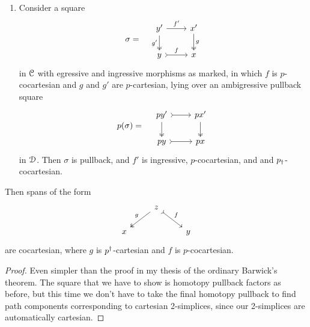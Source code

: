 \documentclass[main.tex]{subfiles}
\begin{document}
\begin{theorem}
\begin{enumerate}
    \item Consider a square
      \begin{equation*}
          \sigma = \quad
          \begin{tikzcd}
            y'
            \arrow[r, "f'"]
            \arrow[d, two heads, swap, "g'"]
            & x'
            \arrow[d, two heads, "g"]
            \\
            y
            \arrow[r, rightarrowtail, "f"]
            & x
          \end{tikzcd}
      \end{equation*}
      in $\mathcal{C}$ with egressive and ingressive morphisms as marked, in which $f$ is $p$-cocartesian and $g$ and $g'$ are $p$-cartesian, lying over an ambigressive pullback square
      \begin{equation*}
        p(\sigma) = \quad
        \begin{tikzcd}
          py'
          \arrow[r, rightarrowtail]
          \arrow[d, two heads]
          & px'
          \arrow[d, two heads]
          \\
          py
          \arrow[r, rightarrowtail]
          & px
        \end{tikzcd}
      \end{equation*}
      in $\mathcal{D}$. Then $\sigma$ is pullback, and $f'$ is ingressive, $p$-cocartesian, and and $p_{\dagger}$-cocartesian.
  \end{enumerate}
  Then spans of the form
  \begin{equation*}
    \begin{tikzcd}
      & z
      \arrow[dl, two heads, swap, "g"]
      \arrow[dr, rightarrowtail, "f"]
      \\
      x
      && y
    \end{tikzcd}
  \end{equation*}
  are cocartesian, where $g$ is $p^{\dagger}$-cartesian and $f$ is $p$-cocartesian.
\end{theorem}
\begin{proof}
  Even simpler than the proof in my thesis of the ordinary Barwick's theorem. The square that we have to show is homotopy pullback factors as before, but this time we don't have to take the final homotopy pullback to find path components corresponding to cartesian 2-simplices, since our 2-simplices are automatically cartesian.
\end{proof}
\end{document}
